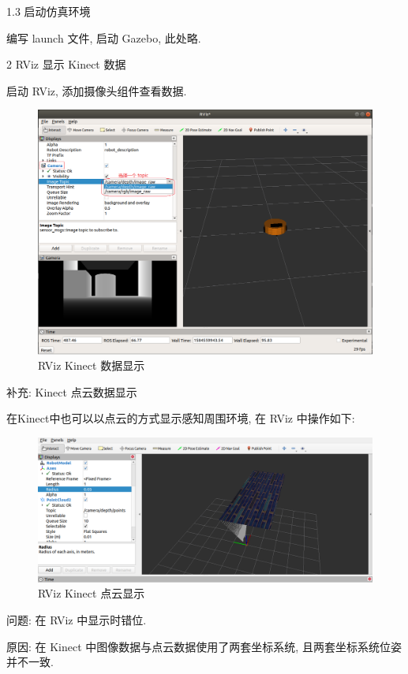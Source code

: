 \documentclass[openany, fontset=windowsold]{ctexbook}
\theoremstyle{kaiti}
\theoremstyle{normal}
\begin{document}
1.3 启动仿真环境

编写 launch 文件, 启动 Gazebo, 此处略.

2 RViz 显示 Kinect 数据

启动 RViz, 添加摄像头组件查看数据.

\begin{figure}[!ht]
  \centering
  \includegraphics[width=.9\textwidth]{rviz_show_kinect_data.png}
  \caption{RViz Kinect 数据显示}
  \label{fig:rviz_show_kinect_data}
\end{figure}

补充: Kinect 点云数据显示

在Kinect中也可以以点云的方式显示感知周围环境, 在 RViz 中操作如下:

\begin{figure}[!ht]
  \centering
  \includegraphics[width=.9\textwidth]{rviz_show_kinect_point_cloud.png}
  \caption{RViz Kinect 点云显示}
  \label{fig:rviz_show_kinect_point_cloud}
\end{figure}

问题: 在 RViz 中显示时错位.

原因: 在 Kinect 中图像数据与点云数据使用了两套坐标系统, 且两套坐标系统位姿并不一致.
\end{document}
